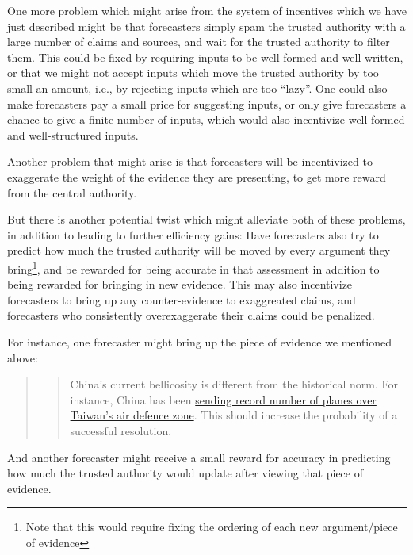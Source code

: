 \documentclass[]{article}
\begin{document}
One more problem which might arise from the system of incentives which
we have just described might be that forecasters simply spam the trusted
authority with a large number of claims and sources, and wait for the
trusted authority to filter them. This could be fixed by requiring
inputs to be well-formed and well-written, or that we might not accept
inputs which move the trusted authority by too small an amount, i.e., by
rejecting inputs which are too ``lazy''. One could also make forecasters
pay a small price for suggesting inputs, or only give forecasters a
chance to give a finite number of inputs, which would also incentivize
well-formed and well-structured inputs.

Another problem that might arise is that forecasters will be
incentivized to exaggerate the weight of the evidence they are
presenting, to get more reward from the central authority.

But there is another potential twist which might alleviate both of these
problems, in addition to leading to further efficiency gains: Have
forecasters also try to predict how much the trusted authority will be
moved by every argument they
bring\footnote{Note that this would require fixing the ordering of each new argument/piece of evidence},
and be rewarded for being accurate in that assessment in addition to
being rewarded for bringing in new evidence. This may also incentivize
forecasters to bring up any counter-evidence to exaggreated claims, and
forecasters who consistently overexaggerate their claims could be
penalized.

For instance, one forecaster might bring up the piece of evidence we
mentioned above:

\begin{quote}
\begin{quote}
China's current bellicosity is different from the historical norm. For
instance, China has been
\href{https://www.bbc.co.uk/news/world-asia-58794094}{sending record
number of planes over Taiwan's air defence zone}. This should increase
the probability of a successful resolution.
\end{quote}
\end{quote}

And another forecaster might receive a small reward for accuracy in
predicting how much the trusted authority would update after viewing
that piece of evidence.
\end{document}
